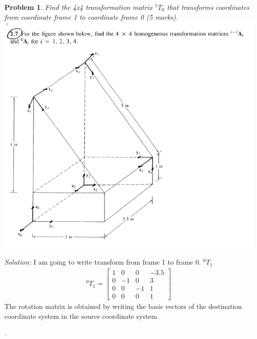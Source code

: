 \documentclass{article}
\newtheorem{prob}{Problem}
\newenvironment{solution}{\emph{Solution:}}{}
\begin{document}
\begin{prob}
  Find the 4x4 transformation matrix $^1T_0$ that transforms coordinates from coordinate frame 1 to coordinate frame 0 (5 marks).\\
  \includegraphics[width=0.7\linewidth,trim=0 0 0 1in,clip]{./media/transformations.png}
\end{prob}
\begin{solution}
I am going to write transform from frame 1 to frame 0. $^0T_1$
\begin{align}
  ^0T_1 = \begin{bmatrix}
    1 & 0 & 0 & -3.5\\
    0 & -1 & 0 & 3 \\
    0 & 0 & -1 & 1\\
    0 & 0 & 0 & 1
  \end{bmatrix}
\end{align}
The rotation matrix is obtained by writing the basis vectors of the destination coordinate system in the source coordinate system.

\end{solution}
\newpage
.
\newpage
\end{document}
